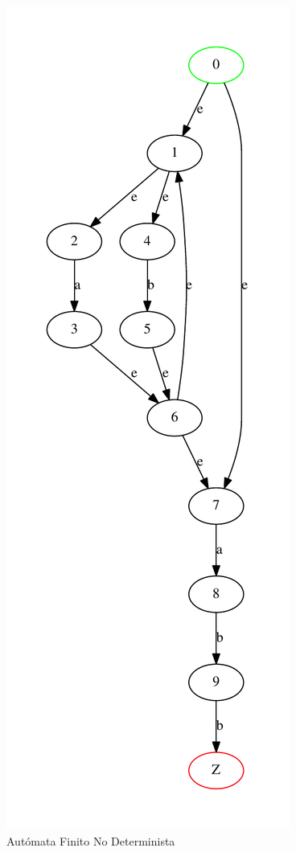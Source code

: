 \documentclass[a4paper,12pt]{article}
\begin{document}
\begin{figure}[h]
 \centering
 \includegraphics[scale = 0.5]{automata1.pdf}
 \caption{Autómata Finito No Determinista}
\end{figure}
\end{document}

